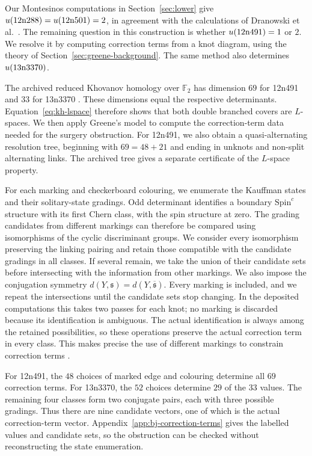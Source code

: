 \documentclass[12pt, oneside]{amsart}
\newcommand{\kn}[2]{\textup{#1#2}}
\begin{document}
Our Montesinos computations in Section~\ref{sec:lower} give
$u(\kn{12n}{288})=u(\kn{12n}{501})=2$, in agreement with the calculations of
Dranowski et al.\ \cite{DGKTdata}. The remaining question in this construction is
whether $u(\kn{12n}{491})=1$ or $2$. We resolve it by computing correction terms
from a knot diagram, using the theory of Section~\ref{sec:greene-background}.
The same method also determines $u(\kn{13n}{3370})$.

The archived reduced Khovanov homology over $\mathbb F_2$ has dimension $69$ for
\kn{12n}{491} and $33$ for \kn{13n}{3370} \cite{KnotInfo}. These dimensions equal
the respective determinants. Equation~\eqref{eq:kh-lspace} therefore shows that
both double branched covers are $L$-spaces. We then apply Greene's model to
compute the correction-term data needed for the surgery obstruction.
For \kn{12n}{491}, we also obtain a quasi-alternating resolution tree, beginning
with $69=48+21$ and ending in unknots and non-split alternating links. The
archived tree gives a separate certificate of the $L$-space property.

For each marking and checkerboard colouring, we enumerate the Kauffman states
and their solitary-state gradings. Odd determinant identifies a boundary
$\mathrm{Spin}^c$ structure with its first Chern class, with the spin structure
at zero. The grading candidates from different markings can therefore be compared
using isomorphisms of the cyclic discriminant groups. We consider every isomorphism
preserving the linking pairing and retain those compatible with the candidate
gradings in all classes. If several remain, we take the union of their candidate
sets before intersecting with the information from other markings. We also impose
the conjugation symmetry $d(Y,\mathfrak s)=d(Y,\overline{\mathfrak s})$.
Every marking is included, and we repeat the intersections until the candidate
sets stop changing. In the deposited computations this takes two passes for
each knot; no marking is discarded because its identification is ambiguous.
The actual identification is always among the retained possibilities, so these
operations preserve the actual correction term in every class. This makes precise
the use of different markings to constrain correction terms
\cite[\S7.1]{Greene}.

For \kn{12n}{491}, the $48$ choices of marked edge and colouring determine all
$69$ correction terms. For \kn{13n}{3370}, the $52$ choices determine $29$ of the
$33$ values. The remaining four classes form two conjugate pairs, each with three
possible gradings. Thus there are nine candidate vectors, one of which is the
actual correction-term vector. Appendix~\ref{app:bj-correction-terms} gives the
labelled values and candidate sets, so the obstruction can be checked without
reconstructing the state enumeration.
\end{document}
